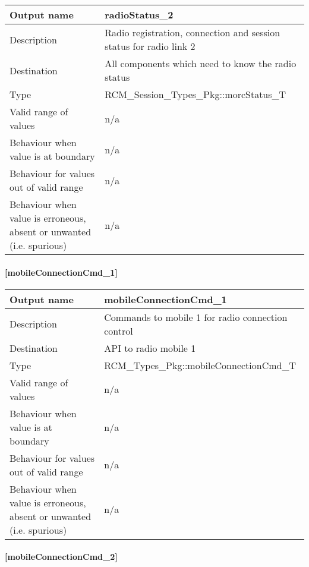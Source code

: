 \begin{longtable}{p{}p{}}
	\toprule
	Output name				& radioStatus\_2 \\
	\midrule
	Description				& Radio registration, connection and session status for radio link 2 \\
	\midrule
	Destination				& All components which need to know the radio status \\ 
	\midrule
	Type					& RCM\_Session\_Types\_Pkg::morcStatus\_T \\
	\midrule
	Valid range of values	& n/a \\
	\midrule
	Behaviour when value is at boundary	& n/a \\
	\midrule
	Behaviour for values out of valid range	& n/a \\
	\midrule
	Behaviour when value is erroneous, absent or unwanted (i.e. spurious) & n/a \\
	\bottomrule
\end{longtable}

\paragraph{[mobileConnectionCmd\_1]}

\begin{longtable}{p{}p{}}
	\toprule
	Output name				& mobileConnectionCmd\_1 \\
	\midrule
	Description				& Commands to mobile 1 for radio connection control  \\
	\midrule
	Destination				& API to radio mobile 1 \\ 
	\midrule
	Type					& RCM\_Types\_Pkg::mobileConnectionCmd\_T \\
	\midrule
	Valid range of values	& n/a \\
	\midrule
	Behaviour when value is at boundary	& n/a \\
	\midrule
	Behaviour for values out of valid range	& n/a \\
	\midrule
	Behaviour when value is erroneous, absent or unwanted (i.e. spurious) & n/a \\
	\bottomrule
\end{longtable}

\paragraph{[mobileConnectionCmd\_2]}

